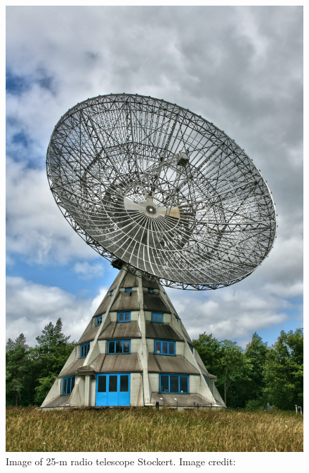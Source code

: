 \documentclass[12pt]{article}
\begin{document}
    
    \begin{figure}[H]
        \centering
        \includegraphics[scale = 2]{fig/stockert.jpg}
        \caption{Image of 25-m radio telescope Stockert. Image credit: \cite{accuracy}}
        \label{fig2.4}
    \end{figure}
    
\end{document}
